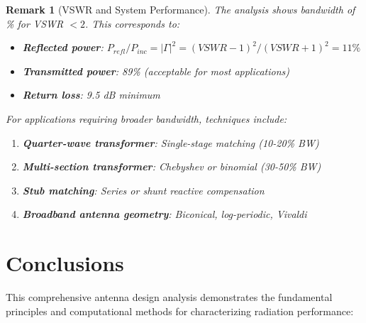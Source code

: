 \documentclass[a4paper, 11pt]{article}
\newtheorem{remark}{Remark}[section]
\begin{document}
\begin{remark}[VSWR and System Performance]
The analysis shows bandwidth of \% for VSWR $< 2$. This corresponds to:
\begin{itemize}
\item \textbf{Reflected power}: $P_{refl}/P_{inc} = |\Gamma|^2 = (VSWR-1)^2/(VSWR+1)^2 = 11\%$
\item \textbf{Transmitted power}: 89\% (acceptable for most applications)
\item \textbf{Return loss}: 9.5 dB minimum
\end{itemize}
For applications requiring broader bandwidth, techniques include:
\begin{enumerate}
\item \textbf{Quarter-wave transformer}: Single-stage matching (10-20\% BW)
\item \textbf{Multi-section transformer}: Chebyshev or binomial (30-50\% BW)
\item \textbf{Stub matching}: Series or shunt reactive compensation
\item \textbf{Broadband antenna geometry}: Biconical, log-periodic, Vivaldi
\end{enumerate}
\end{remark}

\section{Conclusions}

This comprehensive antenna design analysis demonstrates the fundamental principles and computational methods for characterizing radiation performance:
\end{document}
